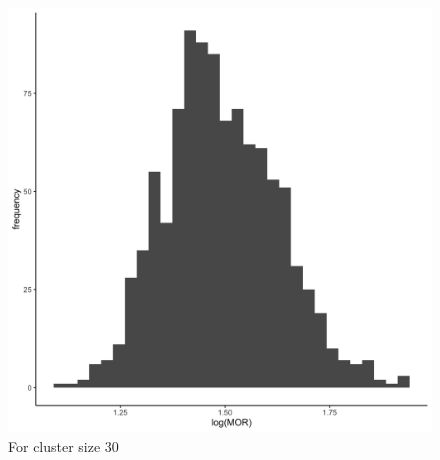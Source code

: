\documentclass[
  letterpaper,
  DIV=11,
  numbers=noendperiod,
  titlepage]{scrartcl}
\begin{document}
\begin{figure}
\begin{minipage}[t]{0.50\linewidth}
{{\includegraphics{../../plots/two-lvl-ran-int/low-prev/hist_100_30_two_lvl_low_prev.png}

}

\caption{For cluster size 30}

}

\end{minipage}%
%
\begin{minipage}[t]{0.50\linewidth}

{\centering 

}
\end{minipage}
\end{figure}
\end{document}
